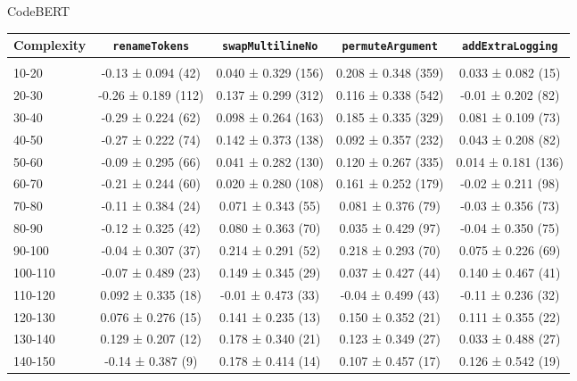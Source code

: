 \documentclass[sigconf,review,anonymous]{acmart}
\begin{document}
  {\center

  CodeBERT
    \begin{table}[H]
      \tiny
      \begin{tabular}{l|cccc}
        Complexity          & \lstinline|renameTokens|        & \lstinline|swapMultilineNo|     & \lstinline|permuteArgument|     & \lstinline|addExtraLogging|     \\\hline\\
        10-20               & -0.13 ± 0.094 (42)  & 0.040 ± 0.329 (156) & 0.208 ± 0.348 (359) & 0.033 ± 0.082 (15)  \\
        20-30               & -0.26 ± 0.189 (112) & 0.137 ± 0.299 (312) & 0.116 ± 0.338 (542) & -0.01 ± 0.202 (82)  \\
        30-40               & -0.29 ± 0.224 (62)  & 0.098 ± 0.264 (163) & 0.185 ± 0.335 (329) & 0.081 ± 0.109 (73)  \\
        40-50               & -0.27 ± 0.222 (74)  & 0.142 ± 0.373 (138) & 0.092 ± 0.357 (232) & 0.043 ± 0.208 (82)  \\
        50-60               & -0.09 ± 0.295 (66)  & 0.041 ± 0.282 (130) & 0.120 ± 0.267 (335) & 0.014 ± 0.181 (136) \\
        60-70               & -0.21 ± 0.244 (60)  & 0.020 ± 0.280 (108) & 0.161 ± 0.252 (179) & -0.02 ± 0.211 (98)  \\
        70-80               & -0.11 ± 0.384 (24)  & 0.071 ± 0.343 (55)  & 0.081 ± 0.376 (79)  & -0.03 ± 0.356 (73)  \\
        80-90               & -0.12 ± 0.325 (42)  & 0.080 ± 0.363 (70)  & 0.035 ± 0.429 (97)  & -0.04 ± 0.350 (75)  \\
        90-100              & -0.04 ± 0.307 (37)  & 0.214 ± 0.291 (52)  & 0.218 ± 0.293 (70)  & 0.075 ± 0.226 (69)  \\
        100-110             & -0.07 ± 0.489 (23)  & 0.149 ± 0.345 (29)  & 0.037 ± 0.427 (44)  & 0.140 ± 0.467 (41)  \\
        110-120             & 0.092 ± 0.335 (18)  & -0.01 ± 0.473 (33)  & -0.04 ± 0.499 (43)  & -0.11 ± 0.236 (32)  \\
        120-130             & 0.076 ± 0.276 (15)  & 0.141 ± 0.235 (13)  & 0.150 ± 0.352 (21)  & 0.111 ± 0.355 (22)  \\
        130-140             & 0.129 ± 0.207 (12)  & 0.178 ± 0.340 (21)  & 0.123 ± 0.349 (27)  & 0.033 ± 0.488 (27)  \\
        140-150             & -0.14 ± 0.387 (9)   & 0.178 ± 0.414 (14)  & 0.107 ± 0.457 (17)  & 0.126 ± 0.542 (19)  \\
      \end{tabular}
    \end{table}


}
\end{document}

